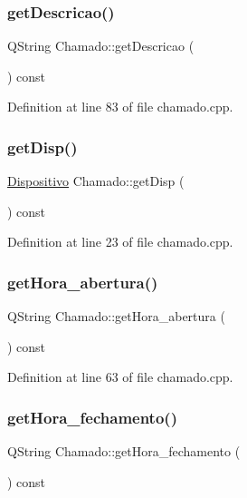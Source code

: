 \subsubsection{\texorpdfstring{get\+Descricao()}{getDescricao()}}
{\footnotesize\ttfamily Q\+String Chamado\+::get\+Descricao (\begin{DoxyParamCaption}{ }\end{DoxyParamCaption}) const}



Definition at line 83 of file chamado.\+cpp.

\hypertarget{class_chamado_a1388c89d1f5ae80b7cfac8106c48dbc9}{}\label{class_chamado_a1388c89d1f5ae80b7cfac8106c48dbc9} 
\subsubsection{\texorpdfstring{get\+Disp()}{getDisp()}}
{\footnotesize\ttfamily \hyperlink{class_dispositivo}{Dispositivo} Chamado\+::get\+Disp (\begin{DoxyParamCaption}{ }\end{DoxyParamCaption}) const}



Definition at line 23 of file chamado.\+cpp.

\hypertarget{class_chamado_a58fd1c5cf9693ccc2ebacc9e7b984de0}{}\label{class_chamado_a58fd1c5cf9693ccc2ebacc9e7b984de0} 
\subsubsection{\texorpdfstring{get\+Hora\+\_\+abertura()}{getHora\_abertura()}}
{\footnotesize\ttfamily Q\+String Chamado\+::get\+Hora\+\_\+abertura (\begin{DoxyParamCaption}{ }\end{DoxyParamCaption}) const}



Definition at line 63 of file chamado.\+cpp.

\hypertarget{class_chamado_a8d6f16bed156bb8241d1068ebe962483}{}\label{class_chamado_a8d6f16bed156bb8241d1068ebe962483} 
\subsubsection{\texorpdfstring{get\+Hora\+\_\+fechamento()}{getHora\_fechamento()}}
{\footnotesize\ttfamily Q\+String Chamado\+::get\+Hora\+\_\+fechamento (\begin{DoxyParamCaption}{ }\end{DoxyParamCaption}) const}



